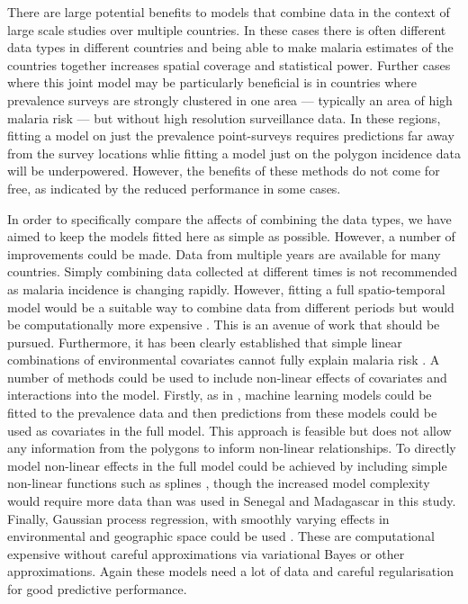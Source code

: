 \documentclass[10pt,letterpaper]{article}
\begin{document}
There are large potential benefits to models that combine data in the context of large scale studies over multiple countries.
In these cases there is often different data types in different countries and being able to make malaria estimates of the countries together increases spatial coverage and statistical power.
Further cases where this joint model may be particularly beneficial is in countries where prevalence surveys are strongly clustered in one area --- typically an area of high malaria risk --- but without high resolution surveillance data. 
In these regions, fitting a model on just the prevalence point-surveys requires predictions far away from the survey locations whlie fitting a model just on the polygon incidence data will be underpowered. 
However, the benefits of these methods do not come for free, as indicated by the reduced performance in some cases.

In order to specifically compare the affects of combining the data types, we have aimed to keep the models fitted here as simple as possible.
However, a number of improvements could be made.
Data from multiple years are available for many countries.
Simply combining data collected at different times is not recommended as malaria incidence is changing rapidly.
However, fitting a full spatio-temporal model would be a suitable way to combine data from different periods but would be computationally more expensive \cite{bhatt2015effect, taylor2017continuous}.
This is an avenue of work that should be pursued.
Furthermore, it has been clearly established that simple linear combinations of environmental covariates cannot fully explain malaria risk \cite{bhatt2017improved}.
A number of methods could be used to include non-linear effects of covariates and interactions into the model.
Firstly, as in \cite{bhatt2017improved}, machine learning models could be fitted to the prevalence data and then predictions from these models could be used as covariates in the full model.
This approach is feasible but does not allow any information from the polygons to inform non-linear relationships.
To directly model non-linear effects in the full model could be achieved by including simple non-linear functions such as splines \cite{sissoko2017temporal, sewe2017using, hundessa2018projecting}, though the increased model complexity would require more data than was used in Senegal and Madagascar in this study.
Finally, Gaussian process regression, with smoothly varying effects in environmental and geographic space could be used \cite{law2018variational}.
These are computational expensive without careful approximations via variational Bayes or other approximations.
Again these models need a lot of data and careful regularisation for good predictive performance.
\end{document}
